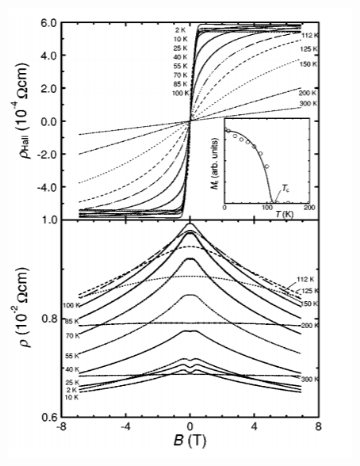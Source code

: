 \documentclass[main.tex]{subfiles}
\begin{document}
\begin{figure}[!htb]
\centering
	\begin{subfigure}[h]{0.5\textwidth}
		\centering
		\includegraphics[width=\linewidth]{matsukura}
  		\caption{}
	\end{subfigure}
	\begin{subfigure}[h]{0.46\textwidth}
  		\centering

\end{subfigure}
\end{figure}
\end{document}
